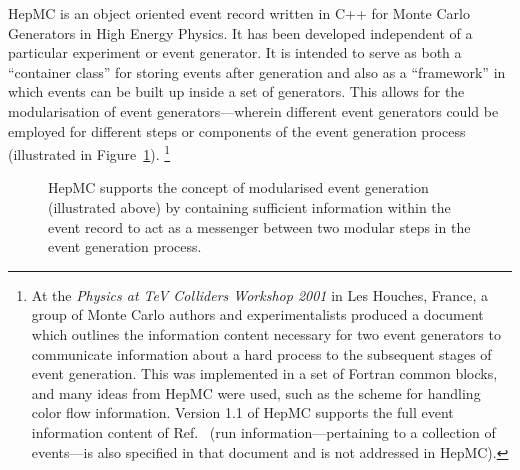 \documentclass[11pt,letterpaper]{article}
\begin{document}
HepMC is an object oriented event record written in C++ for Monte
Carlo Generators in High Energy Physics. It has been developed
independent of a particular experiment or event generator.  It is
intended to serve as both a ``container class'' for storing events after
generation and also as a ``framework'' in which events can be built up
inside a set of generators. This allows for the modularisation of
event generators---wherein different event generators could be
employed for different steps or components of the event generation
process (illustrated in Figure~\ref{modularisation}).
\footnote{
%
At the {\it Physics at TeV Colliders Workshop 2001} in Les
Houches, France, a group of Monte Carlo authors and experimentalists
produced a document~\cite{Boos:2001cv} which outlines the information
content necessary for two event generators to communicate information
about a hard process to the subsequent stages of event
generation. This was implemented in a set of Fortran common blocks,
and many ideas from HepMC were used, such as the scheme for handling
color flow information. Version 1.1 of HepMC supports the full event
information content of Ref.~\cite{Boos:2001cv} (run
information---pertaining to a collection of events---is also specified
in that document and is not addressed in HepMC).  }

\begin{figure}[h]
  \begin{center}
    \end{center}
  \caption[Modularised event generation]{\label{modularisation} 
    HepMC supports the concept of modularised event generation
    (illustrated above) by containing sufficient information within the
    event record to act as a messenger between two modular steps in
    the event generation process.  }
\end{figure}
\end{document}
